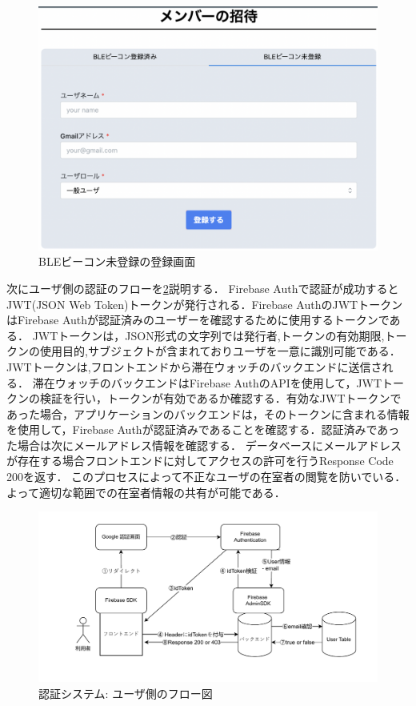 \begin{figure}[tbh]
  \centering
  \includegraphics[width=16cm]{image/registerNotBLE.png}
  \caption{BLEビーコン未登録の登録画面} \label{fig:registerNotBLE}

\end{figure}


\newpage


次にユーザ側の認証のフローを\ref{fig:userLogin}説明する．
Firebase Authで認証が成功するとJWT(JSON Web Token)トークンが発行される．Firebase AuthのJWTトークン はFirebase Authが認証済みのユーザーを確認するために使用するトークンである．
JWTトークンは，JSON形式の文字列では発行者,トークンの有効期限,トークンの使用目的,サブジェクトが含まれておりユーザを一意に識別可能である．
JWTトークンは,フロントエンドから滞在ウォッチのバックエンドに送信される．
滞在ウォッチのバックエンドはFirebase AuthのAPIを使用して，JWTトークンの検証を行い，トークンが有効であるか確認する．有効なJWTトークンであった場合，アプリケーションのバックエンドは，そのトークンに含まれる情報を使用して，Firebase Authが認証済みであることを確認する．認証済みであった場合は次にメールアドレス情報を確認する．
データベースにメールアドレスが存在する場合フロントエンドに対してアクセスの許可を行うResponse Code 200を返す．
このプロセスによって不正なユーザの在室者の閲覧を防いでいる．よって適切な範囲での在室者情報の共有が可能である．



\newpage

\begin{figure}[h]
  \centering  %
  \includegraphics[clip,scale = 0.8]{image/userLogin.pdf}
  \caption{認証システム: ユーザ側のフロー図}    \label{fig:userLogin}
\end{figure}


